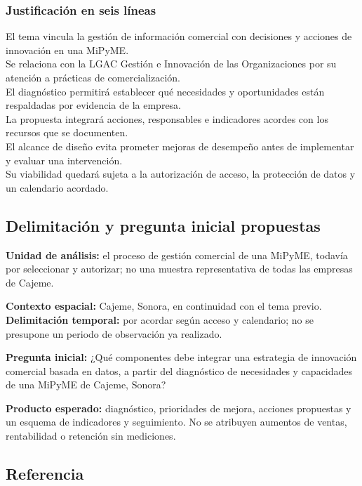 \documentclass[
  spanish,
  11pt,
]{article}
\begin{document}
\subsubsection{Justificación en seis
líneas}\label{justificaciuxf3n-en-seis-luxedneas}

El tema vincula la gestión de información comercial con decisiones y
acciones de innovación en una MiPyME.\\
Se relaciona con la LGAC Gestión e Innovación de las Organizaciones por
su atención a prácticas de comercialización.\\
El diagnóstico permitirá establecer qué necesidades y oportunidades
están respaldadas por evidencia de la empresa.\\
La propuesta integrará acciones, responsables e indicadores acordes con
los recursos que se documenten.\\
El alcance de diseño evita prometer mejoras de desempeño antes de
implementar y evaluar una intervención.\\
Su viabilidad quedará sujeta a la autorización de acceso, la protección
de datos y un calendario acordado.

\subsection{Delimitación y pregunta inicial
propuestas}\label{delimitaciuxf3n-y-pregunta-inicial-propuestas}

\textbf{Unidad de análisis:} el proceso de gestión comercial de una
MiPyME, todavía por seleccionar y autorizar; no una muestra
representativa de todas las empresas de Cajeme.

\textbf{Contexto espacial:} Cajeme, Sonora, en continuidad con el tema
previo. \textbf{Delimitación temporal:} por acordar según acceso y
calendario; no se presupone un periodo de observación ya realizado.

\textbf{Pregunta inicial:} ¿Qué componentes debe integrar una estrategia
de innovación comercial basada en datos, a partir del diagnóstico de
necesidades y capacidades de una MiPyME de Cajeme, Sonora?

\textbf{Producto esperado:} diagnóstico, prioridades de mejora, acciones
propuestas y un esquema de indicadores y seguimiento. No se atribuyen
aumentos de ventas, rentabilidad o retención sin mediciones.

\subsection{Referencia}\label{referencia}
\end{document}
